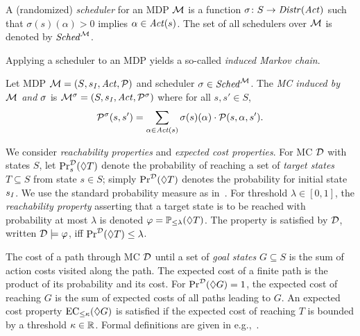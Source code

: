 \begin{definition}[Scheduler]\label{def:scheduler}
	A (randomized) \emph{scheduler} for an MDP $\mdp$ is a function $\sched\colon S\rightarrow\Distr(\Act)$ such that $\sigma(s)(\alpha) > 0$ implies $\alpha \in \Act(s)$.
	The set of all schedulers over $\mdp$ is denoted by $\Sched^\mdp$.
\end{definition}
%
Applying a scheduler to an MDP yields a so-called \emph{induced Markov chain}.

\begin{definition}[Induced MC]\label{def:induced_dtmc}
	Let MDP $\MdpInit$ and scheduler $\sched\in\Sched^\mdp$. The \emph{MC induced by $\mdp$ and $\sched$} is  $\mdp^\sched=(S,\sinit,\Act,\pmdp^\sched)$ where for all $s,s'\in S$,
	\begin{align*}
		 \pmdp^\sched(s,s')=\sum_{\alpha\in\Act(s)} \sched(s)(\act)\cdot\pmdp(s,\alpha,s').
	\end{align*} 
\end{definition}
%
We consider \emph{reachability properties} and \emph{expected cost properties}.
For MC $\dtmc$ with states $S$, let $\reachPrs{\dtmc}{s}{T}$ denote the probability of reaching a set of \emph{target states} $T \subseteq S$ from  state $s\in S$; simply $\reachPrT[\dtmc]$ denotes the probability for initial state $\sinit$.
We use the standard probability measure as in~\cite[Ch.\ 10]{BK08}.
%
For threshold $\lambda\in [0,1]$, the \emph{reachability property} asserting that a target state is to be reached with probability at most $\lambda$ is denoted $\reachPropSymbol = \reachProplT$.
The property is satisfied by $\dtmc$, written $\dtmc \models \reachPropSymbol$, iff $\reachPrT[\dtmc]\leq\lambda$.

The cost of a path through MC $\dtmc$ until a set of \emph{goal states} $G\subseteq S$ is the sum of action costs visited along the path. The expected cost of a finite path is the product of its probability and its cost.
For $\reachPr{\dtmc}{G}  = 1$, the expected cost of reaching $G$ is the sum of expected costs of all paths leading to $G$.
An expected cost property $\expRewProp{\kappa}{G}$ is satisfied if the expected cost of reaching $T$ is bounded by a threshold $\kappa \in \R$.
Formal definitions are given in e.g.,~\cite{BK08}.

